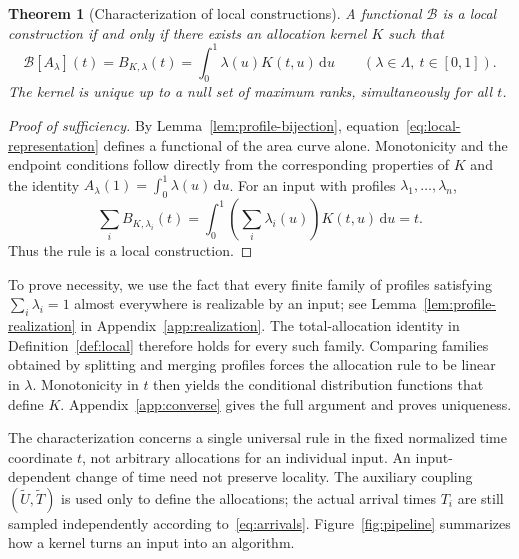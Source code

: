 \documentclass[11pt]{article}
\newtheorem{theorem}{Theorem}[section]
\theoremstyle{definition}
\theoremstyle{remark}
\newcommand{\dd}{\,\mathrm d}
\begin{document}
\begin{theorem}[Characterization of local constructions]\label{thm:local}
A functional $\mathcal B$ is a local construction if and only if there exists an allocation kernel $K$ such that
\begin{equation}\label{eq:local-representation}
 \mathcal B[A_\lambda](t)
 =B_{K,\lambda}(t)
 =\int_0^1\lambda(u)K(t,u)\dd u
 \qquad(\lambda\in\Lambda,\ t\in[0,1]).
\end{equation}
The kernel is unique up to a null set of maximum ranks, simultaneously for all $t$.
\end{theorem}

\begin{proof}[Proof of sufficiency]
By Lemma~\ref{lem:profile-bijection}, equation~\eqref{eq:local-representation} defines a functional of the area curve alone.
Monotonicity and the endpoint conditions follow directly from the corresponding properties of $K$ and the identity $A_\lambda(1)=\int_0^1\lambda(u)\dd u$.
For an input with profiles $\lambda_1,\ldots,\lambda_n$,
\[
 \sum_iB_{K,\lambda_i}(t)
 =\int_0^1\left(\sum_i\lambda_i(u)\right)K(t,u)\dd u
 =t.
\]
Thus the rule is a local construction.
\end{proof}

To prove necessity, we use the fact that every finite family of profiles satisfying $\sum_i\lambda_i=1$ almost everywhere is realizable by an input; see Lemma~\ref{lem:profile-realization} in Appendix~\ref{app:realization}.
The total-allocation identity in Definition~\ref{def:local} therefore holds for every such family.
Comparing families obtained by splitting and merging profiles forces the allocation rule to be linear in $\lambda$.
Monotonicity in $t$ then yields the conditional distribution functions that define $K$.
Appendix~\ref{app:converse} gives the full argument and proves uniqueness.

The characterization concerns a single universal rule in the fixed normalized time coordinate $t$, not arbitrary allocations for an individual input.
An input-dependent change of time need not preserve locality.
The auxiliary coupling $(\widetilde U,\widetilde T)$ is used only to define the allocations; the actual arrival times $T_i$ are still sampled independently according to~\eqref{eq:arrivals}.
Figure~\ref{fig:pipeline} summarizes how a kernel turns an input into an algorithm.
\end{document}
